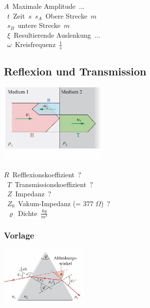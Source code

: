 \unit{$A$}{Maximale Amplitude}{$...$}\\
\unit{$t$}{Zeit}{$s$}
\unit{$s_{A}$}{Obere Strecke}{$m$}\\
\unit{$s_{B}$}{untere Strecke}{$m$}\\
\unit{$\xi$}{Resultierende Auslenkung}{$...$}\\
\unit{$\omega$}{Kreisfrequenz}{$\frac{1}{s}$}\\







\subsection{Reflexion und Transmission}
\begin{center}
	\begin{minipage}{0.3\textwidth}
	\end{minipage}%
	\begin{minipage}{0.2\textwidth}
		\includegraphics[height=4cm,keepaspectratio=true]{Images/reflexion_und_transmission.png}
	\end{minipage}
\end{center}
\unit{$R$}{Refflexionskoeffizient}{$?$}\\
\unit{$T$}{Transmissionskoeffizient}{$?$}\\
\unit{$Z$}{Impedanz}{$?$}\\
\unit{$Z_0$}{Vakum-Impedanz (= 377 $\Omega$)}{$?$}\\
\unit{$\varrho$}{Dichte}{$\frac{kg}{m^3}$}












\subsubsection{Vorlage}

\begin{center}
	\begin{minipage}{0.3\textwidth}
		
	\end{minipage}%
	\begin{minipage}{0.3\textwidth}
		\includegraphics[height=3cm,keepaspectratio=true]{Images/prisma.png}
	\end{minipage}
\end{center}